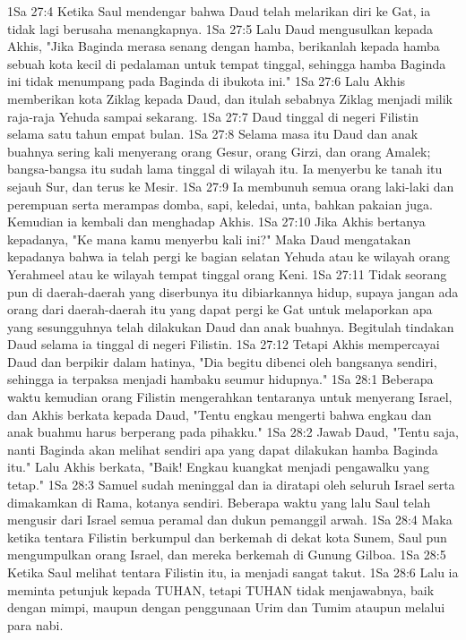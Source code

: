 1Sa 27:4  Ketika Saul mendengar bahwa Daud telah melarikan diri ke Gat, ia tidak lagi berusaha menangkapnya.
1Sa 27:5  Lalu Daud mengusulkan kepada Akhis, "Jika Baginda merasa senang dengan hamba, berikanlah kepada hamba sebuah kota kecil di pedalaman untuk tempat tinggal, sehingga hamba Baginda ini tidak menumpang pada Baginda di ibukota ini."
1Sa 27:6  Lalu Akhis memberikan kota Ziklag kepada Daud, dan itulah sebabnya Ziklag menjadi milik raja-raja Yehuda sampai sekarang.
1Sa 27:7  Daud tinggal di negeri Filistin selama satu tahun empat bulan.
1Sa 27:8  Selama masa itu Daud dan anak buahnya sering kali menyerang orang Gesur, orang Girzi, dan orang Amalek; bangsa-bangsa itu sudah lama tinggal di wilayah itu. Ia menyerbu ke tanah itu sejauh Sur, dan terus ke Mesir.
1Sa 27:9  Ia membunuh semua orang laki-laki dan perempuan serta merampas domba, sapi, keledai, unta, bahkan pakaian juga. Kemudian ia kembali dan menghadap Akhis.
1Sa 27:10  Jika Akhis bertanya kepadanya, "Ke mana kamu menyerbu kali ini?" Maka Daud mengatakan kepadanya bahwa ia telah pergi ke bagian selatan Yehuda atau ke wilayah orang Yerahmeel atau ke wilayah tempat tinggal orang Keni.
1Sa 27:11  Tidak seorang pun di daerah-daerah yang diserbunya itu dibiarkannya hidup, supaya jangan ada orang dari daerah-daerah itu yang dapat pergi ke Gat untuk melaporkan apa yang sesungguhnya telah dilakukan Daud dan anak buahnya. Begitulah tindakan Daud selama ia tinggal di negeri Filistin.
1Sa 27:12  Tetapi Akhis mempercayai Daud dan berpikir dalam hatinya, "Dia begitu dibenci oleh bangsanya sendiri, sehingga ia terpaksa menjadi hambaku seumur hidupnya."
1Sa 28:1  Beberapa waktu kemudian orang Filistin mengerahkan tentaranya untuk menyerang Israel, dan Akhis berkata kepada Daud, "Tentu engkau mengerti bahwa engkau dan anak buahmu harus berperang pada pihakku."
1Sa 28:2  Jawab Daud, "Tentu saja, nanti Baginda akan melihat sendiri apa yang dapat dilakukan hamba Baginda itu." Lalu Akhis berkata, "Baik! Engkau kuangkat menjadi pengawalku yang tetap."
1Sa 28:3  Samuel sudah meninggal dan ia diratapi oleh seluruh Israel serta dimakamkan di Rama, kotanya sendiri. Beberapa waktu yang lalu Saul telah mengusir dari Israel semua peramal dan dukun pemanggil arwah.
1Sa 28:4  Maka ketika tentara Filistin berkumpul dan berkemah di dekat kota Sunem, Saul pun mengumpulkan orang Israel, dan mereka berkemah di Gunung Gilboa.
1Sa 28:5  Ketika Saul melihat tentara Filistin itu, ia menjadi sangat takut.
1Sa 28:6  Lalu ia meminta petunjuk kepada TUHAN, tetapi TUHAN tidak menjawabnya, baik dengan mimpi, maupun dengan penggunaan Urim dan Tumim ataupun melalui para nabi.
